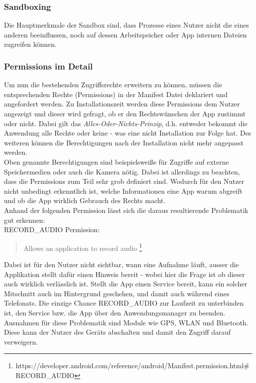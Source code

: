 	\subsubsection{Sandboxing}
	Die Hauptmerkmale der Sandbox sind, dass Prozesse eines Nutzer nicht die eines anderen beeinflussen, noch auf dessen Arbeitspeicher oder App internen Dateien zugreifen können.\\
	
	\subsubsection{Permissions im Detail}
	Um nun die bestehenden Zugriffsrechte erweitern zu können, müssen die entsprechenden Rechte (Permissions) in der Manifest Datei deklariert und angefordert werden. Zu Installationszeit werden diese Permissions dem Nutzer angezeigt und dieser wird gefragt, ob er den Rechtswünschen der App zustimmt oder nicht. Dabei gilt das \textit{Alles-Oder-Nichts-Prinzip}, d.h. entweder bekommt die Anwendung alle Rechte oder keine - was eine nicht Installation zur Folge hat. Des weiteren können die Berechtigungen nach der Installation nicht mehr angepasst werden.\\
	Oben genannte Berechtigungen sind beispielsweiße für Zugriffe auf externe Speichermedien oder auch die Kamera nötig. Dabei ist allerdings zu beachten, dass die Permissions zum Teil sehr grob definiert sind. Wodurch für den Nutzer nicht unbedingt erkenntlich ist, welche Informationen eine App warum abgreift und ob die App wirklich Gebrauch des Rechts macht.\\
	Anhand der folgenden Permission lässt sich die daraus resultierende Problematik gut erkennen:\\
	RECORD\_AUDIO Permission:
	\begin{quote}
	Allows an application to record audio \footnote{https://developer.android.com/reference/android/Manifest.permission.html\#RECORD\_AUDIO}
	\end{quote} 
	Dabei ist für den Nutzer nicht sichtbar, wann eine Aufnahme läuft, ausser die Applikation stellt dafür einen Hinweis bereit - wobei hier die Frage ist ob dieser auch wirklich verlässlich ist. Stellt die App einen Service bereit, kann ein solcher Mitschnitt auch im Hintergrund geschehen, und damit auch während eines Telefonats. Die einzige Chance RECORD\_AUDIO zur Laufzeit zu unterbinden ist, den Service bzw. die App über den Anwendungsmanager zu beenden.\\
	Ausnahmen für diese Problematik sind Module wie GPS, WLAN und Bluetooth. Diese kann der Nutzer des Geräts abschalten und damit den Zugriff darauf verweigern.
